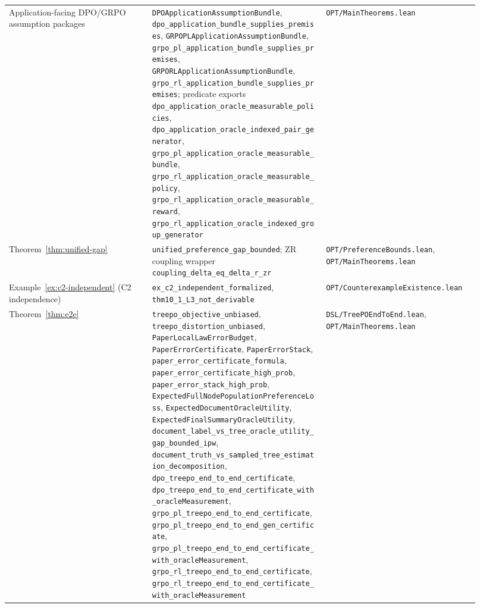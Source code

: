 \begin{table}[h]
\begin{tabular}{p{0.28\linewidth}p{0.34\linewidth}p{0.30\linewidth}}
Application-facing DPO/GRPO assumption packages &
\texttt{DPOApplicationAssumptionBundle}, \texttt{dpo\_application\_bundle\_supplies\_premises}, \texttt{GRPOPLApplicationAssumptionBundle}, \texttt{grpo\_pl\_application\_bundle\_supplies\_premises}, \texttt{GRPORLApplicationAssumptionBundle}, \texttt{grpo\_rl\_application\_bundle\_supplies\_premises}; predicate exports \texttt{dpo\_application\_oracle\_measurable\_policies}, \texttt{dpo\_application\_oracle\_indexed\_pair\_generator}, \texttt{grpo\_pl\_application\_oracle\_measurable\_bundle}, \texttt{grpo\_rl\_application\_oracle\_measurable\_policy}, \texttt{grpo\_rl\_application\_oracle\_measurable\_reward}, \texttt{grpo\_rl\_application\_oracle\_indexed\_group\_generator} &
\texttt{OPT/MainTheorems.lean} \\

Theorem~\ref{thm:unified-gap} &
\texttt{unified\_preference\_gap\_bounded}; ZR coupling wrapper \texttt{coupling\_delta\_eq\_delta\_r\_zr} &
\texttt{OPT/PreferenceBounds.lean}, \texttt{OPT/MainTheorems.lean} \\

Example~\ref{ex:c2-independent} (C2 independence) &
\texttt{ex\_c2\_independent\_formalized}, \texttt{thm10\_1\_L3\_not\_derivable} &
\texttt{OPT/CounterexampleExistence.lean} \\

Theorem~\ref{thm:e2e} &
\texttt{treepo\_objective\_unbiased}, \texttt{treepo\_distortion\_unbiased}, \texttt{PaperLocalLawErrorBudget}, \texttt{PaperErrorCertificate}, \texttt{PaperErrorStack}, \texttt{paper\_error\_certificate\_formula}, \texttt{paper\_error\_certificate\_high\_prob}, \texttt{paper\_error\_stack\_high\_prob}, \texttt{ExpectedFullNodePopulationPreferenceLoss}, \texttt{ExpectedDocumentOracleUtility}, \texttt{ExpectedFinalSummaryOracleUtility}, \texttt{document\_label\_vs\_tree\_oracle\_utility\_gap\_bounded\_ipw}, \texttt{document\_truth\_vs\_sampled\_tree\_estimation\_decomposition}, \texttt{dpo\_treepo\_end\_to\_end\_certificate}, \texttt{dpo\_treepo\_end\_to\_end\_certificate\_with\_oracleMeasurement}, \texttt{grpo\_pl\_treepo\_end\_to\_end\_certificate}, \texttt{grpo\_pl\_treepo\_end\_to\_end\_gen\_certificate}, \texttt{grpo\_pl\_treepo\_end\_to\_end\_certificate\_with\_oracleMeasurement}, \texttt{grpo\_rl\_treepo\_end\_to\_end\_certificate}, \texttt{grpo\_rl\_treepo\_end\_to\_end\_certificate\_with\_oracleMeasurement} &
\texttt{DSL/TreePOEndToEnd.lean}, \texttt{OPT/MainTheorems.lean} \\


\end{tabular}
\end{table}
